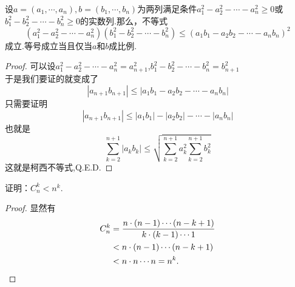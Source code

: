 \begin{corollary}[反向柯西不等式]\label{theorem:不等式.反向柯西不等式}
	设\(a=(a_1,\cdots ,a_n),b=(b_1,\cdots ,b_n)\)为两列满足条件\(a_1^2-a_2^2-\cdots -a_n^2 \ge 0\)或\(b_1^2-b_2^2-\cdots -b_n^2 \ge 0\)的实数列.那么，不等式
	\begin{equation}
		(a_1^2-a_2^2-\cdots -a_n^2)(b_1^2-b_2^2-\cdots -b_n^2)\le (a_1b_1-a_2b_2-\cdots -a_nb_n)^2
	\end{equation}
	成立.等号成立当且仅当\(a\)和\(b\)成比例.
	\begin{proof}
		可以设\(a_1^2-a_2^2-\cdots -a_n^2=a_{n+1}^2\),\(b_1^2-b_2^2-\cdots -b_n^2=b_{n+1}^2\)\\
		于是我们要证的就变成了
		\begin{equation}
			|a_{n+1}b_{n+1}| \le |a_1b_1-a_2b_2-\cdots -a_nb_n|
		\end{equation}
		只需要证明
		\begin{equation}
			|a_{n+1}b_{n+1}| \le |a_1b_1|-|a_2b_2|-\cdots -|a_nb_n|
		\end{equation}
		也就是
		\begin{equation}
			\sum_{k=2}^{n+1} |a_kb_k|\le \sqrt{\sum_{k=2}^{n+1}a_k^2\sum_{k=2}^{n+1}b_k^2} 
		\end{equation}
		这就是柯西不等式,Q.E.D.
	\end{proof}
\end{corollary}

\begin{example}
证明：\(C_n^k < n^k\).
\begin{proof}
显然有\begin{align*}
	C_n^k &= \frac{n \cdot (n-1) \dotsm (n-k+1)}{k \cdot (k-1) \dotsm 1} \\
	&< n \cdot (n-1) \dotsm (n-k+1) \\
	&< n \cdot n \dotsm n = n^k.
	\qedhere
\end{align*}
\end{proof}
\end{example}
